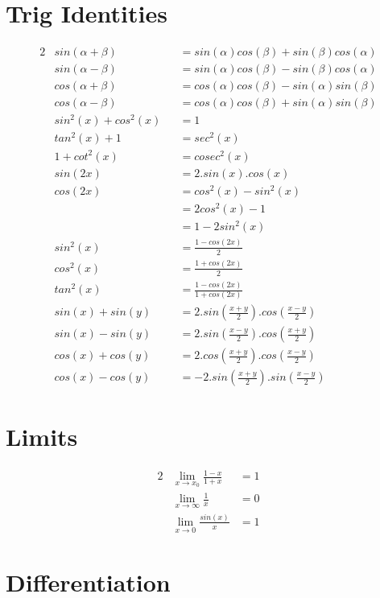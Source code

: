 \documentclass[11pt,a4paper]{article}
\begin{document}
\section{Trig Identities}
\begin{alignat*}{2}
  &sin(\alpha + \beta) &&= sin(\alpha)cos(\beta) + sin(\beta)cos(\alpha) \\
  &sin(\alpha - \beta) &&= sin(\alpha)cos(\beta) - sin(\beta)cos(\alpha) \\
  &cos(\alpha + \beta) &&= cos(\alpha)cos(\beta) - sin(\alpha)sin(\beta) \\
  &cos(\alpha - \beta) &&= cos(\alpha)cos(\beta) + sin(\alpha)sin(\beta) \\
  &sin^2(x) + cos^2(x) &&= 1 \\
  &tan^2(x) + 1 &&= sec^2(x) \\
  &1 + cot^2(x) &&= cosec^2(x) \\
  &sin(2x) &&= 2.sin(x).cos(x) \\
  &cos(2x) &&= cos^2(x) - sin^2(x)\\
  & &&= 2cos^2(x) - 1 \\
  & &&= 1 - 2sin^2(x) \\
  &sin^2(x) &&= \frac{1 - cos(2x)}{2} \\
  &cos^2(x) &&= \frac{1 + cos(2x)}{2} \\
  &tan^2(x) &&= \frac{1-cos(2x)}{1 + cos(2x)} \\
  &sin(x) + sin(y) &&= 2.sin\left(\frac{x+y}{2}\right).cos\left(\frac{x-y}{2}\right) \\
  &sin(x) - sin(y) &&= 2.sin\left(\frac{x-y}{2}\right).cos\left(\frac{x+y}{2}\right) \\
  &cos(x) + cos(y) &&= 2.cos\left(\frac{x+y}{2}\right).cos\left(\frac{x-y}{2}\right) \\
  &cos(x) - cos(y) &&= -2.sin\left(\frac{x+y}{2}\right).sin\left(\frac{x-y}{2}\right)
\end{alignat*}

\section{Limits}
\begin{alignat*}{2}
  &\lim_{x \to x_0} \frac{1-x}{1+x} &= 1 \\
  &\lim_{x \to \infty} \frac{1}{x} &= 0 \\
  &\lim_{x \to 0} \frac{sin(x)}{x} &= 1
\end{alignat*}

\section{Differentiation}
\end{document}
